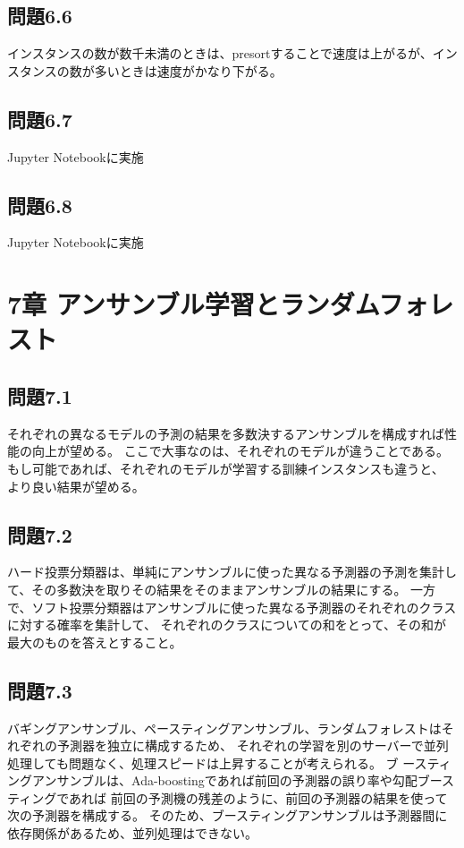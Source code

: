 \documentclass[a4j,twocolumn]{jsarticle}
\begin{document}
\subsection{問題6.6}
インスタンスの数が数千未満のときは、presortすることで速度は上がるが、インスタンスの数が多いときは速度がかなり下がる。

\subsection{問題6.7}
Jupyter Notebookに実施

\subsection{問題6.8}
Jupyter Notebookに実施

\section{7章 アンサンブル学習とランダムフォレスト}
\subsection{問題7.1}
それぞれの異なるモデルの予測の結果を多数決するアンサンブルを構成すれば性能の向上が望める。
ここで大事なのは、それぞれのモデルが違うことである。もし可能であれば、それぞれのモデルが学習する訓練インスタンスも違うと、
より良い結果が望める。

\subsection{問題7.2}
ハード投票分類器は、単純にアンサンブルに使った異なる予測器の予測を集計して、その多数決を取りその結果をそのままアンサンブルの結果にする。
一方で、ソフト投票分類器はアンサンブルに使った異なる予測器のそれぞれのクラスに対する確率を集計して、
それぞれのクラスについての和をとって、その和が最大のものを答えとすること。

\subsection{問題7.3}
バギングアンサンブル、ペースティングアンサンブル、ランダムフォレストはそれぞれの予測器を独立に構成するため、
それぞれの学習を別のサーバーで並列処理しても問題なく、処理スピードは上昇することが考えられる。
ブ
ースティングアンサンブルは、Ada-boostingであれば前回の予測器の誤り率や勾配ブースティングであれば
前回の予測機の残差のように、前回の予測器の結果を使って次の予測器を構成する。
そのため、ブースティングアンサンブルは予測器間に依存関係があるため、並列処理はできない。
\end{document}
